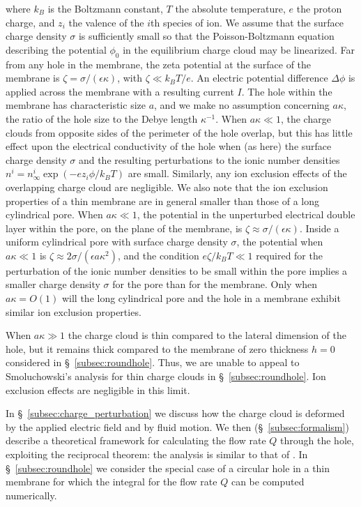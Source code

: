 where $k_B$ is the Boltzmann constant, $T$ the absolute temperature, $e$ the proton charge, and $z_i$ the valence of the $i$th species of ion. We assume that the surface charge density $\sigma$ is sufficiently small so that the Poisson-Boltzmann equation describing the potential $\phi_0$ in the equilibrium charge cloud may be linearized. Far from any hole in the membrane, the zeta potential at the surface of the membrane is $\zeta=\sigma/(\epsilon\kappa)$,
with $\zeta\ll k_BT/e$. An electric potential difference $\Delta \phi$ is applied across the membrane with a resulting current $I$. The hole within the membrane has characteristic size $a$, and we make no assumption concerning $a\kappa$, the ratio of the hole size to the Debye length $\kappa^{-1}$. When $a\kappa\ll 1$, the charge clouds from opposite sides
of the perimeter of the hole overlap, but this has little effect upon the electrical conductivity of the hole when (as here) the surface charge density $\sigma$ and the resulting perturbations to the ionic number densities $n^i=n_\infty^i\exp(-ez_i\phi/k_BT)$ are small. Similarly, any ion exclusion effects of the overlapping charge cloud are negligible. We also note that the ion exclusion properties of a thin membrane are in general smaller than those of a long cylindrical pore. When $a\kappa\ll1$, the potential in the unperturbed electrical double layer within the pore, on the plane of the membrane, is $\zeta\approx\sigma/(\epsilon\kappa)$. Inside a uniform cylindrical pore with surface charge density $\sigma$, the potential when $a\kappa\ll 1$ is 
$\zeta\approx 2\sigma/(\epsilon a\kappa^2)$, and the condition $e\zeta/k_BT\ll 1$ required for the perturbation of the ionic number densities to be small within the pore implies a smaller charge density $\sigma$ for the pore than for the membrane. Only when $a\kappa=O(1)$ will the long cylindrical pore and the hole in a membrane exhibit similar ion exclusion properties.

When $a\kappa\gg 1$ the charge cloud is thin compared to the lateral dimension of the hole, but it remains thick compared to the membrane of zero thickness $h=0$ considered in \S~\ref{subsec:roundhole}. Thus, we are unable to appeal to Smoluchowski's analysis for thin charge clouds in \S~\ref{subsec:roundhole}. Ion exclusion effects are negligible in this limit.

In \S~\ref{subsec:charge_perturbation} we discuss how the charge cloud is deformed by the applied electric field and by fluid motion. We then (\S~\ref{subsec:formalism}) describe a theoretical framework for calculating the flow rate $Q$ through the hole, exploiting the reciprocal theorem: the analysis is similar to that of \cite{Sherwood1995}.  In \S~\ref{subsec:roundhole} we consider the special case of a circular hole in a thin membrane for which the integral for the flow rate $Q$ can be computed numerically.


